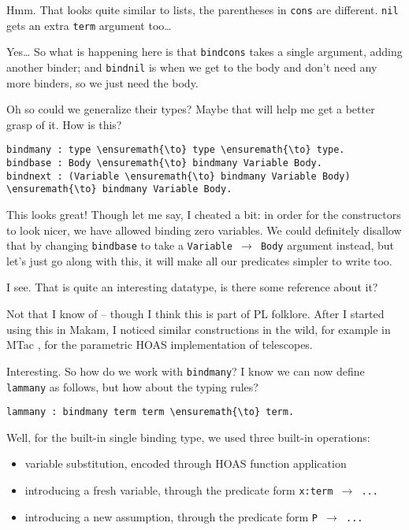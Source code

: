 \heroSTUDENT{} Hmm. That looks quite similar to lists, the parentheses in
\texttt{cons} are different. \texttt{nil} gets an extra \texttt{term}
argument too\ldots{}

\heroADVISOR{} Yes\ldots{} So what is happening here is that \texttt{bindcons}
takes a single argument, adding another binder; and \texttt{bindnil} is
when we get to the body and don't need any more binders, so we just need
the body.

\heroSTUDENT{} Oh so could we generalize their types? Maybe that will help me
get a better grasp of it. How is this?

\begin{verbatim}
bindmany : type \ensuremath{\to} type \ensuremath{\to} type.
bindbase : Body \ensuremath{\to} bindmany Variable Body.
bindnext : (Variable \ensuremath{\to} bindmany Variable Body) \ensuremath{\to} bindmany Variable Body.
\end{verbatim}

\heroADVISOR{} This looks great! Though let me say, I cheated a bit: in order
for the constructors to look nicer, we have allowed binding zero
variables. We could definitely disallow that by changing
\texttt{bindbase} to take a \texttt{Variable\ \ensuremath{\to}\ Body}
argument instead, but let's just go along with this, it will make all
our predicates simpler to write too.

\heroSTUDENT{} I see. That is quite an interesting datatype, is there some
reference about it?

\heroADVISOR{} Not that I know of -- though I think this is part of PL
folklore. After I started using this in Makam, I noticed similar
constructions in the wild, for example in MTac \citep{ziliani2013mtac},
for the parametric HOAS implementation of telescopes.

\heroSTUDENT{} Interesting. So how do we work with \texttt{bindmany}? I know
we can now define \texttt{lammany} as follows, but how about the typing
rules?

\begin{verbatim}
lammany : bindmany term term \ensuremath{\to} term.
\end{verbatim}

\heroADVISOR{} Well, for the built-in single binding type, we used three
built-in operations:

\begin{itemize}
\tightlist
\item
  variable substitution, encoded through HOAS function application
\item
  introducing a fresh variable, through the predicate form
  \texttt{x:term\ \ensuremath{\to}\ ...}
\item
  introducing a new assumption, through the predicate form
  \texttt{P\ \ensuremath{\to}\ ...}
\end{itemize}


